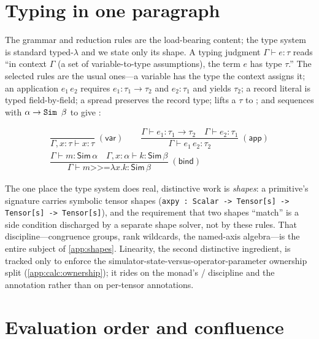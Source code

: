 \section{Typing in one paragraph}
\label{app:calc:typing}

The grammar and reduction rules are the load-bearing content; the type system is
standard typed-$\lambda$ and we state only its shape. A typing judgment
$\Gamma \vdash e : \tau$ reads ``in context $\Gamma$ (a set of variable-to-type
assumptions), the term $e$ has type $\tau$.'' The selected rules are the usual
ones---a variable has the type the context assigns it; an application
$e_1\,e_2$ requires $e_1 : \tau_1 \to \tau_2$ and $e_2 : \tau_1$ and yields
$\tau_2$; a record literal is typed field-by-field; a spread preserves the record
type;  lifts a $\tau$ to ; and \code{>>=} sequences
 with $\alpha \to \texttt{Sim $\beta$}$ to give :

\begin{gather*}
\dfrac{}{\Gamma, x{:}\tau \vdash x : \tau}\;(\textsf{var})
\qquad
\dfrac{\Gamma \vdash e_1 : \tau_1 \to \tau_2 \quad \Gamma \vdash e_2 : \tau_1}
      {\Gamma \vdash e_1\,e_2 : \tau_2}\;(\textsf{app})
\\[6pt]
\dfrac{\Gamma \vdash m : \textsf{Sim}\,\alpha \quad \Gamma, x{:}\alpha \vdash k : \textsf{Sim}\,\beta}
      {\Gamma \vdash m \mathbin{\texttt{>>=}} \lambda x.k : \textsf{Sim}\,\beta}\;(\textsf{bind})
\end{gather*}

\noindent The one place the type system does real, distinctive work is
\emph{shapes}: a primitive's signature carries symbolic tensor shapes
(\lstinline[style=l4style]|axpy : Scalar -> Tensor[s] -> Tensor[s] -> Tensor[s]|),
and the requirement that two shapes ``match'' is a side condition discharged by a
separate shape solver, not by these rules. That discipline---congruence groups,
rank wildcards, the named-axis algebra---is the entire subject of
\cref{app:shapes}. Linearity, the second distinctive ingredient, is tracked only
to enforce the simulator-state-versus-operator-parameter ownership split
(\cref{app:calc:ownership}); it rides on the  monad's /
discipline and the \code{!} annotation rather than on per-tensor annotations.

\section{Evaluation order and confluence}
\label{app:calc:confluence}

